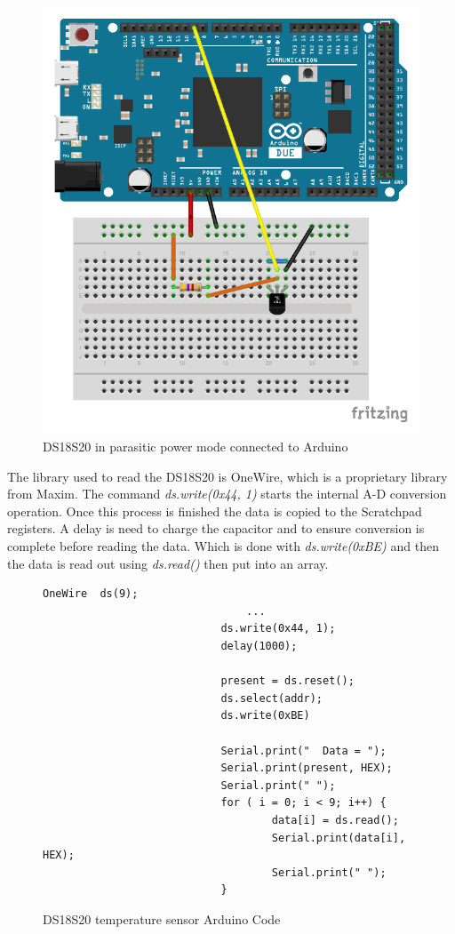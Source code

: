 \begin{figure}[h]
	\centering
	\includegraphics[width=.5\linewidth]{Figures/TempSensor_bb.pdf}
	\caption{DS18S20 in parasitic power mode connected to Arduino}
	\label{fig:tempcircuit}
\end{figure}

The library used to read the DS18S20 is OneWire, which is a proprietary library from Maxim. The command \emph{ds.write(0x44, 1)} starts the internal A-D conversion operation. Once this process is finished the data is copied to the Scratchpad registers. A delay is need to charge the capacitor and to ensure conversion is complete before reading the data. Which is done with \emph{ds.write(0xBE)} and then the data is read out using \emph{ds.read()} then put into an array.

\begin{figure}[H]
\begin{lstlisting}[style=Arduino]
  							OneWire  ds(9);
								...
  							ds.write(0x44, 1); 
  						 	delay(1000);

  							present = ds.reset();
  							ds.select(addr);    
 							ds.write(0xBE)

  							Serial.print("  Data = "); 
  							Serial.print(present, HEX);
 						 	Serial.print(" ");
  							for ( i = 0; i < 9; i++) {          
    								data[i] = ds.read();
    								Serial.print(data[i], HEX);
    								Serial.print(" ");
  							}

\end{lstlisting}
\caption{DS18S20 temperature sensor Arduino Code}
\label{snip:tempcode}
\end{figure}


